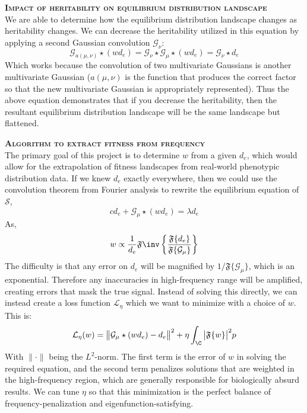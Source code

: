 \documentclass{article}
\begin{document}
\bigskip\noindent\textbf{\textsc{Impact of heritability on equilibrium distribution landscape}}\\
We are able to determine how the equilibrium distribution landscape changes as heritability changes. We can decrease the heritability utilized in this equation by applying a second Gaussian convolution $\mathcal G_\nu$:
$$\mathcal G_{a(\mu,\nu)}\star(wd_e)=\mathcal G_{\nu}\star\mathcal G_{\mu}\star(wd_e)=\mathcal G_\nu\star d_e$$
Which works because the convolution of two multivariate Gaussians is another multivariate Gaussian ($a(\mu,\nu)$ is the function that produces the correct factor so that the new multivariate Gaussian is appropriately represented). Thus the above equation demonstrates that if you decrease the heritability, then the resultant equilibrium distribution landscape will be the same landscape but flattened.

\bigskip\noindent\textbf{\textsc{Algorithm to extract fitness from frequency}}\\
The primary goal of this project is to determine $w$ from a given $d_e$, which would allow for the extrapolation of fitness landscapes from real-world phenotypic distribution data. If we knew $d_e$ exactly everywhere, then we could use the convolution theorem from Fourier analysis to rewrite the equilibrium equation of $\mathcal S$,
$$cd_e+\mathcal G_\mu\star(wd_e)=\lambda d_e$$
As,
$$w\propto\frac1{d_e}\mathfrak F\inv\left\{\frac{\mathfrak F\{d_e\}}{\mathfrak F\{\mathcal G_\mu\}}\right\}$$
The difficulty is that any error on $d_e$ will be magnified by $1/\mathfrak F\{\mathcal G_\mu\}$, which is an exponential. Therefore any inaccuracies in high-frequency range will be amplified, creating errors that mask the true signal. Instead of solving this directly, we can instead create a loss function $\mathcal L_\eta$ which we want to minimize with a choice of $w$. This is:
$$\mathcal L_\eta(w)=\big\|\mathcal G_\mu\star(wd_e)-d_e\big\|^2+\eta\int_{\C}\big|\mathfrak F\{w\}\big|^2p$$
With $\|\cdot\|$ being the $L^2$-norm. The first term is the error of $w$ in solving the required equation, and the second term penalizes solutions that are weighted in the high-frequency region, which are generally responsible for biologically absurd results. We can tune $\eta$ so that this minimization is the perfect balance of frequency-penalization and eigenfunction-satisfying.
\end{document}
